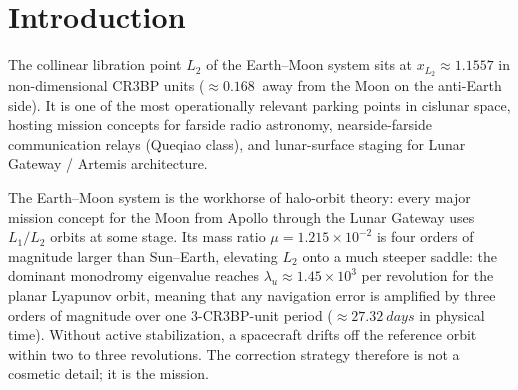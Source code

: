 \documentclass[11pt,a4paper]{article}
\begin{document}
\tableofcontents

\vspace{0.3cm}

\section{Introduction}

The collinear libration point $L_2$ of the Earth--Moon system sits at $x_{L_2} \approx 1.1557$ in non-dimensional CR3BP units ($\approx\SI{0.168}{}$ away from the Moon on the anti-Earth side). It is one of the most operationally relevant parking points in cislunar space, hosting mission concepts for farside radio astronomy, nearside-farside communication relays (Queqiao class), and lunar-surface staging for Lunar Gateway / Artemis architecture.

The Earth--Moon system is the workhorse of halo-orbit theory: every major mission concept for the Moon from Apollo through the Lunar Gateway uses $L_1/L_2$ orbits at some stage. Its mass ratio $\mu = 1.215\times 10^{-2}$ is four orders of magnitude larger than Sun--Earth, elevating $L_2$ onto a much steeper saddle: the dominant monodromy eigenvalue reaches $\lambda_u \approx 1.45\times 10^3$ per revolution for the planar Lyapunov orbit, meaning that any navigation error is amplified by three orders of magnitude over one 3-CR3BP-unit period ($\approx\SI{27.32}{days}$ in physical time). Without active stabilization, a spacecraft drifts off the reference orbit within two to three revolutions. The correction strategy therefore is not a cosmetic detail; it is the mission.
\end{document}
